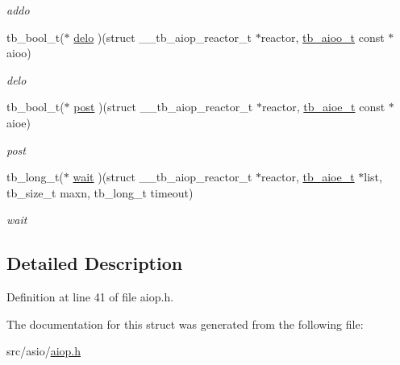 \begin{DoxyCompactItemize}
\begin{DoxyCompactList}\small\item\em addo \end{DoxyCompactList}\item 
\hypertarget{structtb__aiop__reactor__t_aff1e3983b1439a00fae9ed93eb93d105}{tb\-\_\-bool\-\_\-t($\ast$ \hyperlink{structtb__aiop__reactor__t_aff1e3983b1439a00fae9ed93eb93d105}{delo} )(struct \-\_\-\-\_\-tb\-\_\-aiop\-\_\-reactor\-\_\-t $\ast$reactor, \hyperlink{structtb__aioo__t}{tb\-\_\-aioo\-\_\-t} const $\ast$aioo)}\label{structtb__aiop__reactor__t_aff1e3983b1439a00fae9ed93eb93d105}

\begin{DoxyCompactList}\small\item\em delo \end{DoxyCompactList}\item 
\hypertarget{structtb__aiop__reactor__t_a0139b2d54dfffce4d7c769a878d6fdc3}{tb\-\_\-bool\-\_\-t($\ast$ \hyperlink{structtb__aiop__reactor__t_a0139b2d54dfffce4d7c769a878d6fdc3}{post} )(struct \-\_\-\-\_\-tb\-\_\-aiop\-\_\-reactor\-\_\-t $\ast$reactor, \hyperlink{structtb__aioe__t}{tb\-\_\-aioe\-\_\-t} const $\ast$aioe)}\label{structtb__aiop__reactor__t_a0139b2d54dfffce4d7c769a878d6fdc3}

\begin{DoxyCompactList}\small\item\em post \end{DoxyCompactList}\item 
\hypertarget{structtb__aiop__reactor__t_aacb8281e53c6a0a4559b8679478ac5f1}{tb\-\_\-long\-\_\-t($\ast$ \hyperlink{structtb__aiop__reactor__t_aacb8281e53c6a0a4559b8679478ac5f1}{wait} )(struct \-\_\-\-\_\-tb\-\_\-aiop\-\_\-reactor\-\_\-t $\ast$reactor, \hyperlink{structtb__aioe__t}{tb\-\_\-aioe\-\_\-t} $\ast$list, tb\-\_\-size\-\_\-t maxn, tb\-\_\-long\-\_\-t timeout)}\label{structtb__aiop__reactor__t_aacb8281e53c6a0a4559b8679478ac5f1}

\begin{DoxyCompactList}\small\item\em wait \end{DoxyCompactList}\end{DoxyCompactItemize}


\subsection{Detailed Description}


Definition at line 41 of file aiop.\-h.



The documentation for this struct was generated from the following file\-:\begin{DoxyCompactItemize}
\item 
src/asio/\hyperlink{aiop_8h}{aiop.\-h}\end{DoxyCompactItemize}
